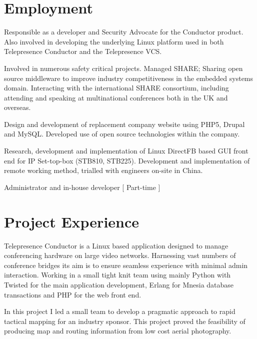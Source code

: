 \documentclass[overlapped,line,letterpaper]{res}
\begin{document}
\begin{resume}
\section{\bf Employment}
{
    Responsible as a developer and Security Advocate for the Conductor product.
    Also involved in developing the underlying Linux platform used in both
    Telepresence Conductor and the Telepresence VCS.
}

{
    Involved in numerous safety critical projects. Managed SHARE;
    Sharing open source middleware to improve industry competitiveness
    in the embedded systems domain. Interacting with the international SHARE
    consortium, including attending and speaking at multinational conferences both in the UK and overseas.
}

{
    Design and development of replacement company website using PHP5, Drupal and
    MySQL.
    Developed use of open source technologies within the company.
}

{
    Research, development and implementation of Linux DirectFB based GUI front end
    for IP Set-top-box (STB810, STB225). Development and implementation of remote
    working method, trialled with engineers on-site in China.
}

{
    Administrator and in-house developer [ Part-time ]
}


\section{\bf Project Experience}
{
    Telepresence Conductor is a Linux based application designed to manage
    conferencing hardware on large video networks.
    Harnessing vast numbers of conference bridges its aim is to ensure seamless
    experience with minimal admin interaction.
    Working in a small tight knit team using mainly Python with Twisted for
    the main application development, Erlang for Mnesia database transactions
    and PHP for the web front end.
}

{
    In this project I led a small team to develop a pragmatic approach to rapid
    tactical mapping for an industry sponsor.
    This project proved the feasibility of producing map and routing information
    from low cost aerial photography.
}


\end{resume}
\end{document}
